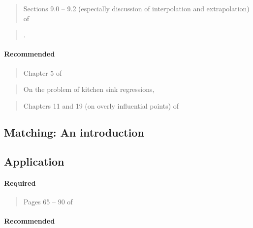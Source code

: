 \documentclass[12pt]{article}
\newcommand{\bibverse}[1]{\begin{verse} \bibentry{#1}. \end{verse}}
\begin{document}
\begin{verse}  \end{verse}

\begin{verse} Sections 9.0 -- 9.2 (especially discussion of interpolation and extrapolation) of  \end{verse}

\bibverse{berk2010}

\paragraph*{Recommended}

\begin{verse} Chapter 5 of  \end{verse}

\begin{verse}  \end{verse}

\begin{verse} On the problem of kitchen sink regressions,  \end{verse}

\begin{verse} Chapters 11 and 19 (on overly influential points) of  \end{verse}

\subsection{Matching: An introduction}

\subsection*{Application}

\begin{verse}  \end{verse}

\paragraph*{Required}

\begin{verse}
  Pages 65 -- 90 of 
\end{verse}

\paragraph*{Recommended}
\end{document}
